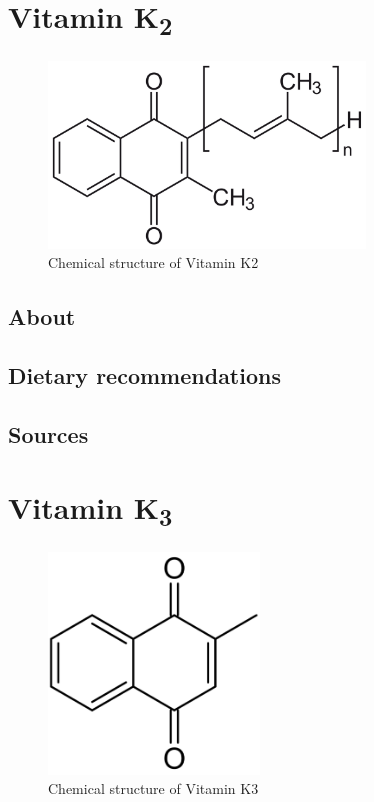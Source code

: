 \documentclass{book}
\begin{document}
\begin{sloppypar}
\chapter{Vitamin K\texorpdfstring{\textsubscript{2}}{2}}
\begin{figure}[h]
	\caption{Chemical structure of Vitamin K2}
	\centering \includegraphics[width=0.75\textwidth]{images/Vitamin_K2_chemical_structure}
\end{figure}
\newpage

\section{About}


\section{Dietary recommendations}


\section{Sources}


\chapter{Vitamin K\texorpdfstring{\textsubscript{3}}{3}}
\begin{figure}[h]
	\caption{Chemical structure of Vitamin K3}
	\centering \includegraphics[width=0.5\textwidth]{images/Vitamin_K3_chemical_structure}
\end{figure}
\newpage


\end{sloppypar}
\end{document}
